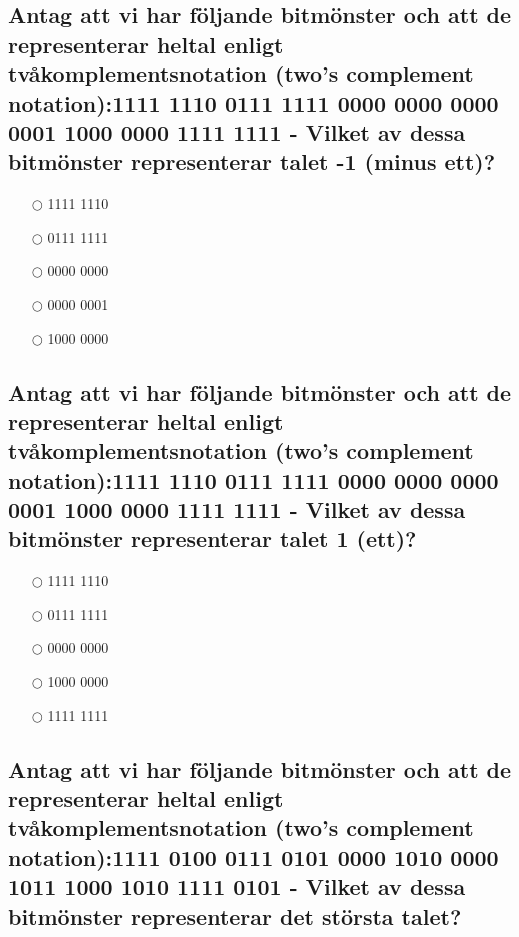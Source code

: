 \documentclass[a4paper,11pt,oneside]{article}
\begin{document}
\begin{sloppypar}
\subsection{Antag att vi har f\"oljande bitm\"onster och att de representerar heltal enligt tv\r{a}komplementsnotation (two{\textquoteright}s complement notation):1111 1110 0111 1111 0000 0000 0000 0001 1000 0000 1111 1111 - Vilket av dessa bitm\"onster representerar talet -1 (minus ett)?}

\label{q:35000:mc:sv:True}

\begin{itemize}
  \item[$\bigcirc$] 1111 1110
  \item[$\bigcirc$] 0111 1111
  \item[$\bigcirc$] 0000 0000
  \item[$\bigcirc$] 0000 0001
  \item[$\bigcirc$] 1000 0000
\end{itemize}

\subsection{Antag att vi har f\"oljande bitm\"onster och att de representerar heltal enligt tv\r{a}komplementsnotation (two{\textquoteright}s complement notation):1111 1110 0111 1111 0000 0000 0000 0001 1000 0000 1111 1111 - Vilket av dessa bitm\"onster representerar talet 1 (ett)?}

\label{q:3500001:mc:sv:True}

\begin{itemize}
  \item[$\bigcirc$] 1111 1110
  \item[$\bigcirc$] 0111 1111
  \item[$\bigcirc$] 0000 0000
  \item[$\bigcirc$] 1000 0000
  \item[$\bigcirc$] 1111 1111
\end{itemize}



\subsection{Antag att vi har f\"oljande bitm\"onster och att de representerar heltal enligt tv\r{a}komplementsnotation (two{\textquoteright}s complement notation):1111 0100 0111 0101 0000 1010 0000 1011 1000 1010 1111 0101 - Vilket av dessa bitm\"onster representerar det st\"orsta talet?}


\end{sloppypar}
\end{document}
